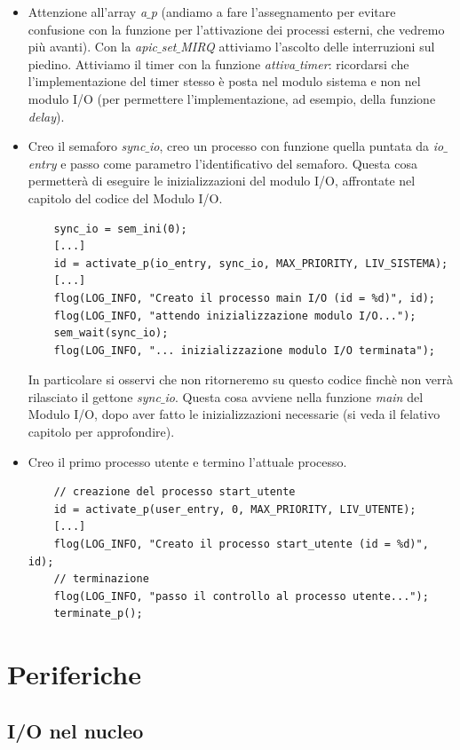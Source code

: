 \documentclass[11pt]{report}
\theoremstyle{definition}
\begin{document}
\begin{itemize}
	\item Attenzione all'array \emph{a$\_$p} (andiamo a fare l'assegnamento per evitare confusione con la funzione per l'attivazione dei processi esterni, che vedremo più avanti). Con la \emph{apic$\_$set$\_$MIRQ} attiviamo l'ascolto delle interruzioni sul piedino. Attiviamo il timer con la funzione \emph{attiva$\_$timer}: ricordarsi che l'implementazione del timer stesso è posta nel modulo sistema e non nel modulo I/O (per permettere l'implementazione, ad esempio, della funzione \emph{delay}).
	\item Creo il semaforo \emph{sync$\_$io}, creo un processo con funzione quella puntata da \emph{io$\_$entry} e passo come parametro l'identificativo del semaforo. Questa cosa permetterà di eseguire le inizializzazioni del modulo I/O, affrontate nel capitolo del codice del Modulo I/O.
	\small
	\begin{verbatim}
	sync_io = sem_ini(0);
	[...]
	id = activate_p(io_entry, sync_io, MAX_PRIORITY, LIV_SISTEMA);
	[...]
	flog(LOG_INFO, "Creato il processo main I/O (id = %d)", id);
	flog(LOG_INFO, "attendo inizializzazione modulo I/O...");
	sem_wait(sync_io);
	flog(LOG_INFO, "... inizializzazione modulo I/O terminata");
	\end{verbatim}
	\normalsize
	In particolare si osservi che non ritorneremo su questo codice finchè non verrà rilasciato il gettone \emph{sync$\_$io}. Questa cosa avviene nella funzione \emph{main} del Modulo I/O, dopo aver fatto le inizializzazioni necessarie (si  veda il felativo capitolo per approfondire).
	\item Creo il primo processo utente e termino l'attuale processo.
	\small 
	\begin{verbatim}
	// creazione del processo start_utente
	id = activate_p(user_entry, 0, MAX_PRIORITY, LIV_UTENTE);
	[...]
	flog(LOG_INFO, "Creato il processo start_utente (id = %d)", id);
	// terminazione
	flog(LOG_INFO, "passo il controllo al processo utente...");
	terminate_p();
	\end{verbatim}
	\normalsize
\end{itemize}
\chapter{Periferiche}




\section{I/O nel nucleo}  
\end{document}
